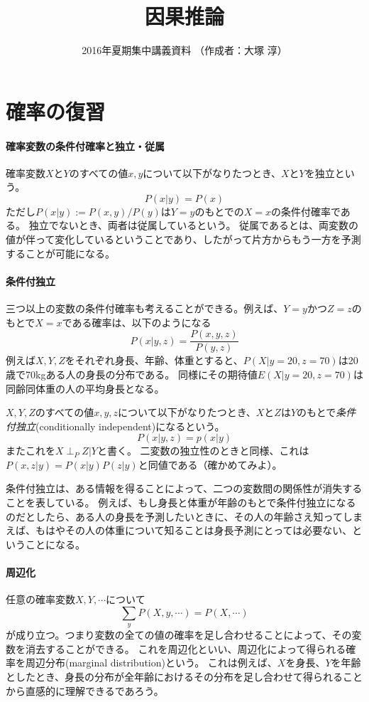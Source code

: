 \documentclass{jsarticle}
\title{因果推論}
\author{2016年夏期集中講義資料 （作成者：大塚 淳）}
\date{ }                                           %
\begin{document}
\maketitle

\section{確率の復習}

\paragraph{確率変数の条件付確率と独立・従属\\}
確率変数$X$と$Y$のすべての値$x, y$について以下がなりたつとき、$X$と$Y$を独立という。
\[
 P(x|y) = P(x)
\]
ただし$P(x|y) := P(x, y)/P(y)$は$Y=y$のもとでの$X=x$の条件付確率である。
独立でないとき、両者は従属しているという。
従属であるとは、両変数の値が伴って変化しているということであり、したがって片方からもう一方を予測することが可能になる。

\paragraph{条件付独立\\}
三つ以上の変数の条件付確率も考えることができる。例えば、$Y=y$かつ$Z=z$のもとで$X=x$である確率は、以下のようになる
\[
 P(x|y, z) = \frac{P(x, y, z)}{P(y, z)}
\]
例えば$X, Y, Z$をそれぞれ身長、年齢、体重とすると、$P(X|y=20,z=70)$は20歳で70kgある人の身長の分布である。
同様にその期待値$E(X|y=20,z=70)$は同齢同体重の人の平均身長となる。

$X, Y, Z$のすべての値$x, y, z$について以下がなりたつとき、$X$と$Z$は$Y$のもとで\emph{条件付独立}(conditionally independent)になるという。
\[
 P(x|y, z) = p(x|y)
\]
またこれを$X \perp_P Z |Y$と書く。
二変数の独立性のときと同様、これは$P(x, z|y)=P(x|y)P(z|y)$と同値である（確かめてみよ）。

条件付独立は、ある情報を得ることによって、二つの変数間の関係性が消失することを表している。
例えば、もし身長と体重が年齢のもとで条件付独立になるのだとしたら、ある人の身長を予測したいときに、その人の年齢さえ知ってしまえば、もはやその人の体重について知ることは身長予測にとっては必要ない、ということになる。


\paragraph{周辺化\\}
任意の確率変数$X, Y, \cdots$について
\[
 \sum_y P(X, y, \cdots) = P(X, \cdots) 
\]
が成り立つ。つまり変数の全ての値の確率を足し合わせることによって、その変数を消去することができる。
これを周辺化といい、周辺化によって得られる確率を周辺分布(marginal distribution)という。
これは例えば、$X$を身長、$Y$を年齢としたとき、身長の分布が全年齢におけるその分布を足し合わせて得られることから直感的に理解できるであろう。
\end{document}
